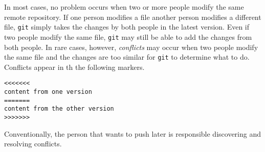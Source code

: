 In most cases, no problem occurs when two or more people modify the
same remote repository. If one person modifies a file another person
modifies a different file, {\tt git} simply takes the changes by both
people in the latest version.  Even if two people modify the same
file, {\tt git} may still be able to add the changes from both people.
In rare cases, however, {\it conflicts} may occur when two people
modify the same file and the changes are too similar for {\tt git} to
determine what to do.  Conflicts appear in th the following markers.

\begin{verbatim}
<<<<<<< 
content from one version
=======
content from the other version
>>>>>>> 
\end{verbatim}


Conventionally, the person that wants to push later is responsible
discovering and resolving conflicts.

